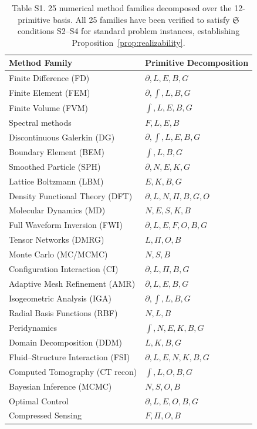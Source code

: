\documentclass[11pt,a4paper]{article}
\newcommand{\Sclass}{\mathfrak{S}}
\begin{document}
\begin{table}[htbp]
\centering
\caption{Table S1. 25 numerical method families decomposed over the 12-primitive basis. All 25 families have been verified to satisfy $\Sclass$ conditions S2--S4 for standard problem instances, establishing Proposition~\ref{prop:realizability}.}
\small
\begin{tabularx}{\textwidth}{lX}
\toprule
\textbf{Method Family} & \textbf{Primitive Decomposition} \\
\midrule
Finite Difference (FD) & $\partial, L, E, B, G$ \\
Finite Element (FEM) & $\partial, \int, L, B, G$ \\
Finite Volume (FVM) & $\int, L, E, B, G$ \\
Spectral methods & $F, L, E, B$ \\
Discontinuous Galerkin (DG) & $\partial, \int, L, E, B, G$ \\
Boundary Element (BEM) & $\int, L, B, G$ \\
Smoothed Particle (SPH) & $\partial, N, E, K, G$ \\
Lattice Boltzmann (LBM) & $E, K, B, G$ \\
Density Functional Theory (DFT) & $\partial, L, N, \Pi, B, G, O$ \\
Molecular Dynamics (MD) & $N, E, S, K, B$ \\
Full Waveform Inversion (FWI) & $\partial, L, E, F, O, B, G$ \\
Tensor Networks (DMRG) & $L, \Pi, O, B$ \\
Monte Carlo (MC/MCMC) & $N, S, B$ \\
Configuration Interaction (CI) & $\partial, L, \Pi, B, G$ \\
Adaptive Mesh Refinement (AMR) & $\partial, L, E, B, G$ \\
Isogeometric Analysis (IGA) & $\partial, \int, L, B, G$ \\
Radial Basis Functions (RBF) & $N, L, B$ \\
Peridynamics & $\int, N, E, K, B, G$ \\
Domain Decomposition (DDM) & $L, K, B, G$ \\
Fluid--Structure Interaction (FSI) & $\partial, L, E, N, K, B, G$ \\
Computed Tomography (CT recon) & $\int, L, O, B, G$ \\
Bayesian Inference (MCMC) & $N, S, O, B$ \\
Optimal Control & $\partial, L, E, O, B, G$ \\
Compressed Sensing & $F, \Pi, O, B$ \\

\end{tabularx}
\end{table}
\end{document}
